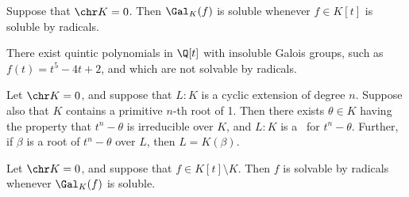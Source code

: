 \documentclass{article}
\begin{document}
  \begin{tcorollary}
    Suppose that \( \chr K = 0 \).
    Then \( \Gal_K(f) \) is soluble whenever \( f\in K[t] \) is soluble by radicals.
  \end{tcorollary}

  \begin{tcorollary}
    There exist quintic polynomials in \( \Q[t] \) with insoluble Galois groups, such as \( f(t) = t^5-4t+2 \), and which are not solvable by radicals.
  \end{tcorollary}

  \begin{tlemma}
    Let \( \chr K = 0 \), and suppose that \( L:K \) is a cyclic extension of degree \( n \).
    Suppose also that \( K \) contains a primitive \( n \)-th root of 1.
    Then there exists \( \theta \in K \) having the property that \( t^n -\theta \) is irreducible over \( K \), and \( L:K \) is a \sf~for \( t^n-\theta \).
    Further, if \( \beta \) is a root of \( t^n-\theta \) over \( L \), then \( L=K(\beta) \).
  \end{tlemma}

  \begin{ttheorem}
    Let \( \chr K = 0 \), and suppose that \( f\in K[t]\setminus K \).
    Then \( f \) is solvable by radicals whenever \( \Gal_K(f) \) is soluble.
  \end{ttheorem}
\end{document}
